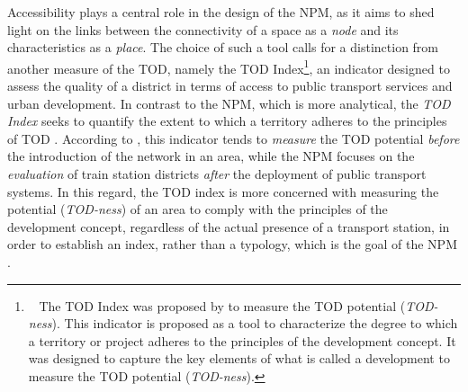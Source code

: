 \begin{refsegment}
Accessibility plays a central role in the design of the \acrshort{NPM}, as it aims to shed light on the links between the connectivity of a space as a \textsl{node} and its characteristics as a \textsl{place}. The choice of such a tool calls for a distinction from another measure of the \acrshort{TOD}, namely the \acrshort{TOD} Index\footnote{~
    The \acrshort{TOD} Index was proposed by \textcolor{blue}{\textcite[9]{evans_transit-oriented_2007}} to measure the \acrshort{TOD} potential (\textsl{TOD-ness}). This indicator is proposed as a tool to characterize the degree to which a territory or project adheres to the principles of the development concept. It was designed to capture the key elements of what is called a  development \textcolor{blue}{\autocite[97]{evans_transit-oriented_2007}} to measure the \acrshort{TOD} potential (\textsl{TOD-ness}).
}, an indicator designed to assess the quality of a district in terms of access to public transport services and urban development. In contrast to the \acrshort{NPM}, which is more analytical, the \textsl{TOD Index} seeks to quantify the extent to which a territory adheres to the principles of \acrshort{TOD} \textcolor{blue}{\autocite[3]{pezeshknejad_evaluating_2020}}. According to \textcolor{blue}{\textcite[96]{singh_measuring_2017}}, this indicator tends to \textsl{measure} the \acrshort{TOD} potential \textsl{before} the introduction of the network in an area, while the \acrshort{NPM} focuses on the \textsl{evaluation} of train station districts \textsl{after} the deployment of public transport systems. In this regard, the \acrshort{TOD} index is more concerned with measuring the potential (\textsl{TOD-ness}) of an area to comply with the principles of the development concept, regardless of the actual presence of a transport station, in order to establish an index, rather than a typology, which is the goal of the \acrshort{NPM} \textcolor{blue}{\autocite[97, 107]{evans_transit-oriented_2007}}.%


\end{refsegment}
